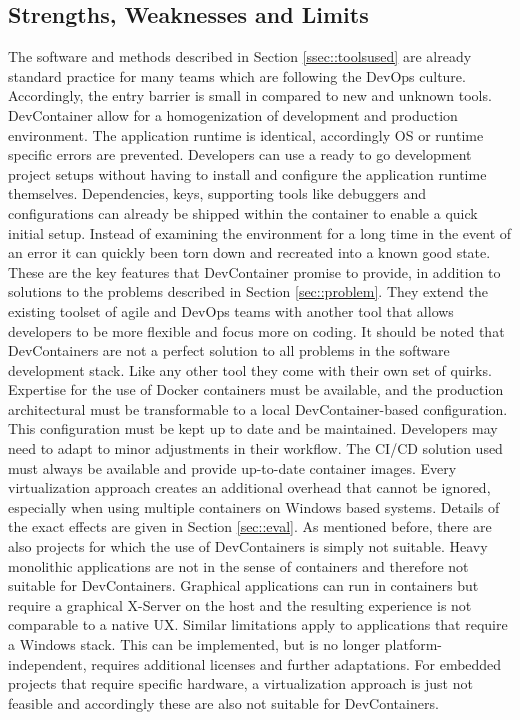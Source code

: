 \documentclass[12pt, a4paper]{article}
\begin{document}
    \subsection{Strengths, Weaknesses and Limits}\label{ssec::limits}
    The software and methods described in Section \ref{ssec::toolsused} are already standard practice for many teams which are following the DevOps culture. Accordingly, the entry barrier is small in compared to new and unknown tools. DevContainer allow for a homogenization of development and production environment. The application runtime is identical, accordingly \ac{OS} or runtime specific errors are prevented. Developers can use a ready to go development project setups without having to install and configure the application runtime themselves. Dependencies, keys, supporting tools like debuggers and configurations can already be shipped within the container to enable a quick initial setup. Instead of examining the environment for a long time in the event of an error it can quickly been torn down and recreated into a known good state. These are the key features that DevContainer promise to provide, in addition to solutions to the problems described in Section \ref{sec::problem}. They extend the existing toolset of agile and DevOps teams with another tool that allows developers to be more flexible and focus more on coding.\newline
    It should be noted that DevContainers are not a perfect solution to all problems in the software development stack. Like any other tool they come with their own set of quirks. Expertise for the use of Docker containers must be available, and the production architectural must be transformable to a local DevContainer-based configuration. This configuration must be kept up to date and be maintained. Developers may need to adapt to minor adjustments in their workflow. The CI/CD solution used must always be available and provide up-to-date container images. Every virtualization approach creates an additional overhead that cannot be ignored, especially when using multiple containers on Windows based systems. Details of the exact effects are given in Section \ref{sec::eval}.\newline
    As mentioned before, there are also projects for which the use of DevContainers is simply not suitable. Heavy monolithic applications are not in the sense of containers and therefore not suitable for DevContainers. Graphical applications can run in containers but require a graphical X-Server on the host and the resulting experience is not comparable to a native \ac{UX}. Similar limitations apply to applications that require a Windows stack. This can be implemented, but is no longer platform-independent, requires additional licenses and further adaptations. For embedded projects that require specific hardware, a virtualization approach is just not feasible and accordingly these are also not suitable for DevContainers.\newline
\end{document}
